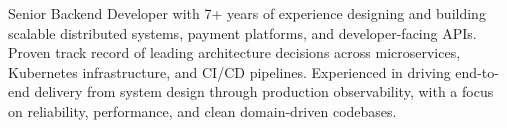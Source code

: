 
\begin{cvparagraph}
Senior Backend Developer with 7+ years of experience designing and building scalable distributed systems, payment platforms, and developer-facing APIs. Proven track record of leading architecture decisions across microservices, Kubernetes infrastructure, and CI/CD pipelines. Experienced in driving end-to-end delivery from system design through production observability, with a focus on reliability, performance, and clean domain-driven codebases.
\end{cvparagraph}
